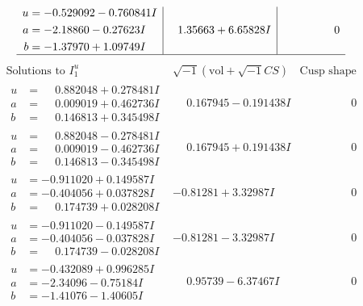 \documentclass[1p]{elsarticle_modified}
\theoremstyle{definition}
\newcommand{\I}{\sqrt{-1}}
\begin{document}
$$\begin{array}{c|c|c}
\begin{aligned}
u &= -0.529092 - 0.760841 I \\
a &= -2.18860 - 0.27623 I \\
b &= -1.37970 + 1.09749 I\end{aligned}
 & \phantom{-}1.35663 + 6.65828 I & \phantom{-0.000000 } 0\\
 \hline 
 \end{array}$$\newpage$$\begin{array}{c|c|c}  
\text{Solutions to }I^u_{1}& \I (\text{vol} + \sqrt{-1}CS) & \text{Cusp shape}\\
 \hline 
\begin{aligned}
u &= \phantom{-}0.882048 + 0.278481 I \\
a &= \phantom{-}0.009019 + 0.462736 I \\
b &= \phantom{-}0.146813 + 0.345498 I\end{aligned}
 & \phantom{-}0.167945 - 0.191438 I & \phantom{-0.000000 } 0 \\ \hline\begin{aligned}
u &= \phantom{-}0.882048 - 0.278481 I \\
a &= \phantom{-}0.009019 - 0.462736 I \\
b &= \phantom{-}0.146813 - 0.345498 I\end{aligned}
 & \phantom{-}0.167945 + 0.191438 I & \phantom{-0.000000 } 0 \\ \hline\begin{aligned}
u &= -0.911020 + 0.149587 I \\
a &= -0.404056 + 0.037828 I \\
b &= \phantom{-}0.174739 + 0.028208 I\end{aligned}
 & -0.81281 + 3.32987 I & \phantom{-0.000000 } 0 \\ \hline\begin{aligned}
u &= -0.911020 - 0.149587 I \\
a &= -0.404056 - 0.037828 I \\
b &= \phantom{-}0.174739 - 0.028208 I\end{aligned}
 & -0.81281 - 3.32987 I & \phantom{-0.000000 } 0 \\ \hline\begin{aligned}
u &= -0.432089 + 0.996285 I \\
a &= -2.34096 - 0.75184 I \\
b &= -1.41076 - 1.40605 I\end{aligned}
 & \phantom{-}0.95739 - 6.37467 I & \phantom{-0.000000 } 0 \\ \hline\begin{aligned}

\end{aligned}
\end{array}$$
\end{document}
